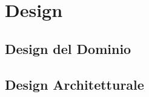 \section{Design}
\frame{\tableofcontents[currentsection]}

\subsection{Design del Dominio}





\subsection{Design Architetturale}




